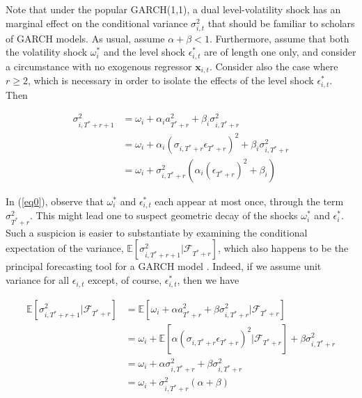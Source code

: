 \documentclass[11pt]{article}
\newcommand{\x}{\textbf{x}}
\theoremstyle{definition}
\begin{document}
Note that under the popular GARCH(1,1), a dual level-volatility shock has an marginal effect on the conditional variance $\sigma^{2}_{i,t}$ that should be familiar to scholars of GARCH models.  As usual, assume $\alpha+\beta < 1$.  Furthermore, assume that both the volatility shock $\omega^{*}_{i}$ and the level shock $\epsilon^{*}_{i,t}$ are of length one only, and consider a circumstance with no exogenous regressor $\x_{i,t}$. Consider also the case where $r\geq 2$, which is necessary in order to isolate the effects of the level shock $\epsilon^{*}_{i,t}$.  Then

\begin{align}
\sigma^{2}_{i,T^{*}+r+1} & = \omega_{i} + \alpha_{i} a_{T^{*}+r}^{2} + \beta_{i}\sigma^{2}_{i,T^{*}+r} \label{eq0}\\
& = \omega_{i} + \alpha_{i}(\sigma_{i,T^{*}+r}\epsilon_{T^{*}+r})^{2} + \beta_{i}\sigma^{2}_{i,T^{*}+r} \\
& = \omega_{i} + \sigma^{2}_{i,T^{*}+r}(\alpha_{i} (\epsilon_{T^{*}+r})^{2} + \beta_{i})
\end{align}

In (\ref{eq0}), observe that $\omega_{i}^{*}$ and $\epsilon^{*}_{i,t}$ each appear at most once, through the term $\sigma^{2}_{T^{*}+r}$.  This might lead one to suspect  geometric decay of the shocks $\omega_{i}^{*}$ and $\epsilon^{*}_{i}$.  Such a suspicion is easier to substantiate by examining the conditional expectation of the variance, $\mathbb{E}[ \sigma^{2}_{i,T^{*}+r+1} |\mathcal{F}_{T^{*}+r}]$, which also happens to be the principal forecasting tool for a GARCH model \citep{zivot2009practical}.  Indeed, if we assume unit variance for all $\epsilon_{i,t}$ except, of course, $\epsilon^{*}_{i,t}$, then we have 

\begin{align*}
\mathbb{E}[ \sigma^{2}_{i,T^{*}+r+1} |\mathcal{F}_{T^{*}+r}] & = \mathbb{E}[\omega_{i} + \alpha a_{T^{*}+r}^{2} + \beta\sigma^{2}_{i,T^{*}+r} |\mathcal{F}_{T^{*}+r}] \\
& = \omega_{i} + \mathbb{E}[\alpha(\sigma_{i,T^{*}+r}\epsilon_{T^{*}+r})^{2} |\mathcal{F}_{T^{*}+r}] + \beta\sigma^{2}_{i,T^{*}+r} \\
& = \omega_{i} + \alpha\sigma_{i,T^{*}+r}^{2} + \beta\sigma^{2}_{i,T^{*}+r} \tag{Due to the unit variance assumption}\\
& = \omega_{i} + \sigma^{2}_{i,T^{*}+r}(\alpha + \beta) \\
\end{align*}
\end{document}
